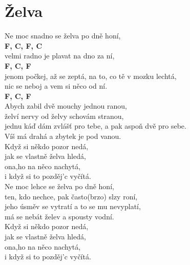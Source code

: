 \section{Želva}
\onehalfspacing

Ne moc snadno se želva po dně honí,\\
\textbf{F, C, F, C}\\
velmi radno je plavat na dno za ní,\\
\textbf{F, C, F}\\
jenom počkej, až se zeptá, na to, co tě v mozku lechtá,\\
nic se neboj a vem si něco od ní.\\
\textbf{F, C, F}\\

\sloka
Abych zabil dvě mouchy jednou ranou,\\
želví nervy od želvy schovám stranou,\\
jednu káď dám zvlášť pro tebe, a pak aspoň dvě pro sebe.\\
Víš má drahá a zbytek je pod vanou.\\

{}Když si někdo pozor nedá,\\ 
jak se vlastně želva hledá,\\
ona,ho na něco nachytá, \\
i když si to pozděj’c vyčítá.\\

\sloka
Ne moc lehce se želva po dně honí,\\
ten, kdo nechce, pak často(brzo) slzy roní,\\
jeho úsměv se vytratí a to se mu nevyplatí,\\
má se nebát želev a spousty vodní. \\

Když si někdo pozor nedá, \\
jak se vlastně želva hledá,\\
ona,ho na něco nachytá, \\
i když si to pozděj’c vyčítá.\\




